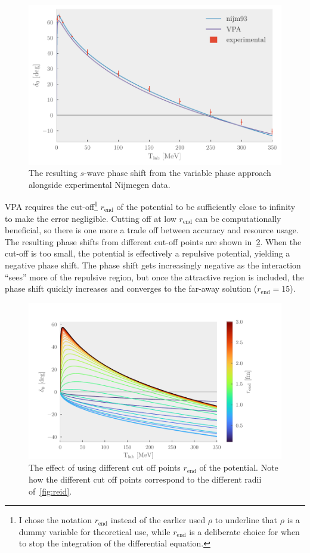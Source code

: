 \begin{figure}[ht!]
  \centering
  \includegraphics[]{Figures/vpa.pdf}
  \caption{\label{fig:vpa}The resulting \(s\)-wave phase shift from the variable
    phase approach alongside experimental Nijmegen data.}
\end{figure}

VPA requires the cut-off\footnote{I chose the notation \(r_{\text{end}}\) instead of
  the earlier used $\rho$ to underline that $\rho$ is a dummy variable for
  theoretical use, while $r_{\text{end}}$ is a deliberate choice for when to
  stop the integration of the differential equation.} \(r_{\text{end}}\) of the potential to be sufficiently close to infinity
to make the error negligible. Cutting off at low \(r_{\text{end}}\) can be computationally
beneficial, so there is one more a trade off between accuracy and resource
usage. The resulting phase shifts from different cut-off points are shown
in~\cref{fig:rend}. When the cut-off is too small, the potential is effectively
a repulsive potential, yielding a negative phase shift. The phase shift gets
increasingly negative as the interaction ``sees'' more of the repulsive region,
but once the attractive region is included, the phase shift quickly increases
and converges to the far-away solution (\(r_{\text{end}}=15\)).


\begin{figure}[ht!]
  \centering
  \includegraphics[]{Figures/rend.pdf}
  \caption{\label{fig:rend}The effect of using different cut off points
    \(r_{\mathrm{end}}\) of the potential. Note how the different cut off points
    correspond to the different radii of~\cref{fig:reid}.}
\end{figure}


